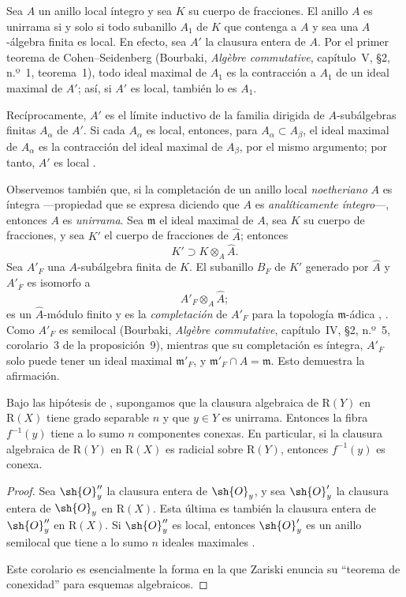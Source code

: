 \documentclass[oneside]{amsart}
\newcommand{\oldpage}[2][]{{\marginnote{\normalfont\textbf{#1}~|~#2}}\ignorespaces}
\let\EGAOriginalLabel\label
\renewcommand{\label}[1]{\phantomsection\EGAOriginalLabel{#1}}
\begin{document}
Sea $A$ un anillo local íntegro y sea $K$ su cuerpo de fracciones. El
anillo $A$ es unirrama si y solo si todo subanillo $A_1$ de $K$ que
contenga a $A$ y sea una $A$-álgebra finita es local. En efecto, sea
$A'$ la clausura entera de $A$. Por el primer teorema de
Cohen--Seidenberg (Bourbaki, \emph{Alg\`ebre commutative}, capítulo~V,
\S2, n.º~1, teorema~1), todo ideal maximal de $A_1$ es la contracción
a $A_1$ de un ideal maximal de $A'$; así, si $A'$ es local, también
lo es $A_1$.

\oldpage[III]{133}

Recíprocamente, $A'$ es el límite inductivo de la familia dirigida de
$A$-subálgebras finitas $A_\alpha$ de $A'$. Si cada $A_\alpha$ es
local, entonces, para $A_\alpha\subset A_\beta$, el ideal maximal de
$A_\alpha$ es la contracción del ideal maximal de $A_\beta$, por el
mismo argumento; por tanto, $A'$ es local
.

Observemos también que, si la completación de un anillo local
\emph{noetheriano} $A$ es íntegra ---propiedad que se expresa diciendo que
$A$ es \emph{analíticamente íntegro}---, entonces $A$ es \emph{unirrama}.
Sea $\mathfrak{m}$ el ideal maximal de $A$, sea $K$ su cuerpo de
fracciones, y sea $K'$ el cuerpo de fracciones de $\widehat{A}$;
entonces
\[
  K'\supset K\otimes_A\widehat{A}.
\]
Sea $A'_F$ una $A$-subálgebra finita de $K$. El subanillo $B_F$ de
$K'$ generado por $\widehat{A}$ y $A'_F$ es isomorfo a
\[
  A'_F\otimes_A\widehat{A};
\]
es un $\widehat{A}$-módulo finito y es la \emph{completación} de $A'_F$
para la topología $\mathfrak{m}$-ádica
, . Como $A'_F$ es semilocal
(Bourbaki, \emph{Alg\`ebre commutative}, capítulo~IV, \S2, n.º~5,
corolario~3 de la proposición~9), mientras que su completación es
íntegra, $A'_F$ solo puede tener un ideal maximal $\mathfrak{m}'_F$, y
$\mathfrak{m}'_F\cap A=\mathfrak{m}$. Esto demuestra la afirmación.

\begin{corollary}[4.3.7]
\label{III.4.3.7}
Bajo las hipótesis de \textup{}, supongamos que la clausura
algebraica de $\mathrm{R}(Y)$ en $\mathrm{R}(X)$ tiene grado separable
$n$ y que $y\in Y$ es unirrama. Entonces la fibra $f^{-1}(y)$ tiene a
lo sumo $n$ componentes conexas. En particular, si la clausura
algebraica de $\mathrm{R}(Y)$ en $\mathrm{R}(X)$ es radicial sobre
$\mathrm{R}(Y)$, entonces $f^{-1}(y)$ es conexa.
\end{corollary}

\begin{proof}
Sea $\sh{O}''_y$ la clausura entera de $\sh{O}_y$, y sea
$\sh{O}'_y$ la clausura entera de $\sh{O}_y$ en $\mathrm{R}(X)$.
Esta última es también la clausura entera de $\sh{O}''_y$ en
$\mathrm{R}(X)$. Si $\sh{O}''_y$ es local, entonces $\sh{O}'_y$ es
un anillo semilocal que tiene a lo sumo $n$ ideales maximales
\cite[vol.~I, p.~289, Theorem~22]{I-13}.

Este corolario es esencialmente la forma en la que Zariski enuncia su
``teorema de conexidad'' para esquemas algebraicos.
\end{proof}
\end{document}
